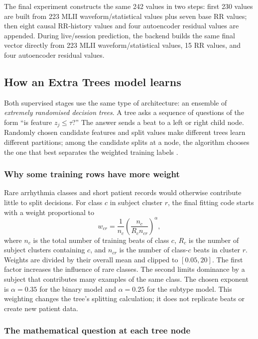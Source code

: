 The final experiment constructs the same 242 values in two steps: first 230
values are built from 223 MLII waveform/statistical values plus seven base RR
values; then eight causal RR-history values and four autoencoder residual
values are appended. During live/session prediction, the backend builds the
same final vector directly from 223 MLII waveform/statistical values, 15 RR
values, and four autoencoder residual values.

\subsection{How an Extra Trees model learns}

Both supervised stages use the same type of architecture: an ensemble of
\emph{extremely randomised decision trees}. A tree asks a sequence of
questions of the form ``is feature $z_j\leq\tau$?'' The answer sends a beat
to a left or right child node. Randomly chosen candidate features and split
values make different trees learn different partitions; among the candidate
splits at a node, the algorithm chooses the one that best separates the
weighted training labels \cite{geurts2006extratrees}.

\subsubsection{Why some training rows have more weight}

Rare arrhythmia classes and short patient records would otherwise contribute
little to split decisions. For class $c$ in subject cluster $r$, the final
fitting code starts with a weight proportional to
\begin{equation}
 w_{cr}=\frac{1}{n_c}
 \left(\frac{n_c}{R_c n_{cr}}\right)^\alpha,
 \label{eq:method-record-weight}
\end{equation}
where $n_c$ is the total number of training beats of class $c$, $R_c$ is the
number of subject clusters containing $c$, and $n_{cr}$ is the number of
class-$c$ beats in cluster $r$. Weights are divided by their overall mean
and clipped to $[0.05,20]$. The first factor increases the influence of
rare classes. The second limits dominance by a subject that contributes many
examples of the same class. The chosen exponent is $\alpha=0.35$ for the
binary model and $\alpha=0.25$ for the subtype model. This weighting changes
the tree's splitting calculation; it does not replicate beats or create
new patient data.

\subsubsection{The mathematical question at each tree node}

